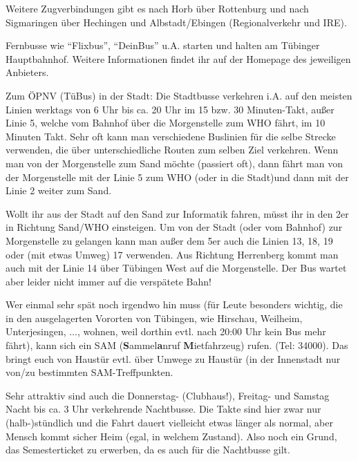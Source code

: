 Weitere Zugverbindungen gibt es nach Horb über Rottenburg
  und nach Sigmaringen über Hechingen und Albstadt/Ebingen (Regionalverkehr und IRE).
  
Fernbusse wie "`Flixbus"', "`DeinBus"' u.A. starten und halten am Tübinger Hauptbahnhof. Weitere Informationen findet ihr auf der Homepage
des jeweiligen Anbieters.

Zum ÖPNV (TüBus) in der Stadt: Die Stadtbusse verkehren i.A. auf
  den meisten Linien werktags von 6 Uhr bis ca. 20 Uhr im 15 bzw. 30 Minuten-Takt,
  außer Linie 5, welche vom Bahnhof über die Morgenstelle zum WHO fährt, im 10
  Minuten Takt. Sehr oft kann man verschiedene Buslinien für die selbe Strecke
  verwenden, die über unterschiedliche Routen zum selben Ziel verkehren.
  Wenn man von der Morgenstelle zum Sand möchte (passiert oft), dann
  fährt man von der Morgenstelle mit der Linie 5
  zum WHO (oder in die Stadt)und dann mit der Linie 2 weiter zum Sand.

  Wollt ihr aus der Stadt auf den Sand zur Informatik fahren, müsst ihr in
  den 2er in Richtung Sand/WHO einsteigen.
  Um von der Stadt (oder vom Bahnhof) zur Morgenstelle zu gelangen kann man
  außer dem 5er auch die Linien 13, 18, 19 oder (mit etwas Umweg) 17 verwenden.
  Aus Richtung Herrenberg kommt man auch mit der Linie 14 über Tübingen West
  auf die Morgenstelle. Der Bus wartet aber leider nicht immer auf die verspätete Bahn!


Wer einmal sehr spät noch irgendwo hin muss (für Leute besonders
  wichtig, die in den ausgelagerten Vororten von Tübingen, wie Hirschau,
  Weilheim, Unterjesingen, ..., wohnen, weil dorthin evtl. nach 20:00 Uhr
  kein Bus mehr fährt), kann sich ein SAM (\textbf{S}ammel\textbf{a}nruf
  \textbf{M}ietfahrzeug) rufen. (Tel: 34000).  Das bringt euch von Haustür
  evtl. über Umwege zu Haustür (in der Innenstadt nur von/zu bestimmten
  SAM-Treffpunkten.

Sehr attraktiv sind auch die Donnerstag- (Clubhaus!), Freitag- und
  Samstag Nacht bis ca. 3 Uhr verkehrende Nachtbusse.  Die Takte sind
  hier zwar nur (halb-)stündlich und die Fahrt dauert vielleicht etwas
  länger als normal, aber Mensch kommt sicher Heim (egal, in
  welchem Zustand).  Also noch ein Grund, das Semesterticket zu
  erwerben, da es auch für die Nachtbusse gilt.

